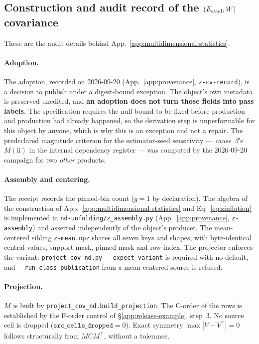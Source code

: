 \subsection{Construction and audit record of the $(E_{\mathrm{avail}},W)$ covariance}
\label{app:release-audit}

These are the audit details behind App.~\ref{app:multidimensional-statistics}.

\paragraph{Adoption.} The adoption, recorded on 2026-09-20 (App.~\ref{app:provenance}, \texttt{z-cv-record}), is a decision to publish under a digest-bound exception. The object's own metadata is preserved unedited, and \textbf{an adoption does not turn those fields into pass labels.} The specification requires the null bound to be fixed before production and production had already happened, so the derivation step is unperformable for this object by anyone, which is why this is an exception and not a repair. The predeclared magnitude criterion for the estimator-seed sensitivity --- \emph{cause~3}'s $M(\mathrm{ii})$ in the internal dependency register --- was computed by the 2026-09-20 campaign for two \emph{other} products.

\paragraph{Assembly and centering.} The receipt records the pinned-bin count ($g=1$ by declaration). The algebra of the construction of App.~\ref{app:multidimensional-statistics} and Eq.~\eqref{eq:zinflation} is implemented in \texttt{nd-unfolding/z\_assembly.py} (App.~\ref{app:provenance}, \texttt{z-assembly}) and asserted independently of the object's producer. The mean-centered sibling \texttt{z-mean.npz} shares all seven keys and shapes, with byte-identical central values, support mask, pinned mask and row index. The projector enforces the variant: \texttt{project\_cov\_nd.py -{}-expect-variant} is required with no default, and \texttt{-{}-run-class publication} from a mean-centered source is refused.

\paragraph{Projection.} $M$ is built by \texttt{project\_cov\_nd.build\_projection}. The C-order of the rows is established by the F-order control of \S\ref{app:release-example}, step~3. No source cell is dropped ($\texttt{src\_cells\_dropped}=0$). Exact symmetry $\max|V-V^{\top}|=0$ follows structurally from $M C M^{\top}$, without a tolerance.

